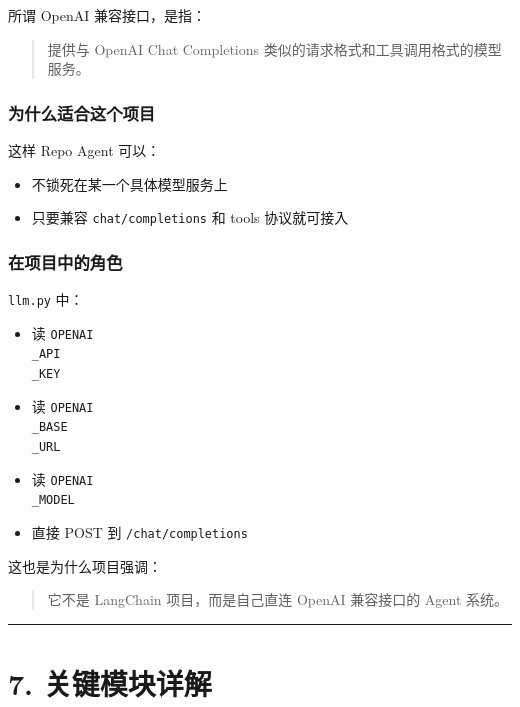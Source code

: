 \documentclass[UTF8,12pt,openany]{ctexbook}
\begin{document}
所谓 OpenAI 兼容接口，是指：\par

\begin{quote}
提供与 OpenAI Chat Completions 类似的请求格式和工具调用格式的模型服务。
\end{quote}

\subsubsection{为什么适合这个项目}

这样 Repo Agent 可以：\par

\begin{itemize}
\item 不锁死在某一个具体模型服务上
\item 只要兼容 \texttt{chat/completions} 和 tools 协议就可接入
\end{itemize}

\subsubsection{在项目中的角色}

\texttt{llm.py} 中：\par

\begin{itemize}
\item 读 \texttt{OPENAI\\_API\\_KEY}
\item 读 \texttt{OPENAI\\_BASE\\_URL}
\item 读 \texttt{OPENAI\\_MODEL}
\item 直接 POST 到 \texttt{/chat/completions}
\end{itemize}

这也是为什么项目强调：\par

\begin{quote}
它不是 LangChain 项目，而是自己直连 OpenAI 兼容接口的 Agent 系统。
\end{quote}

\hrule

\section{7. 关键模块详解}
\end{document}
